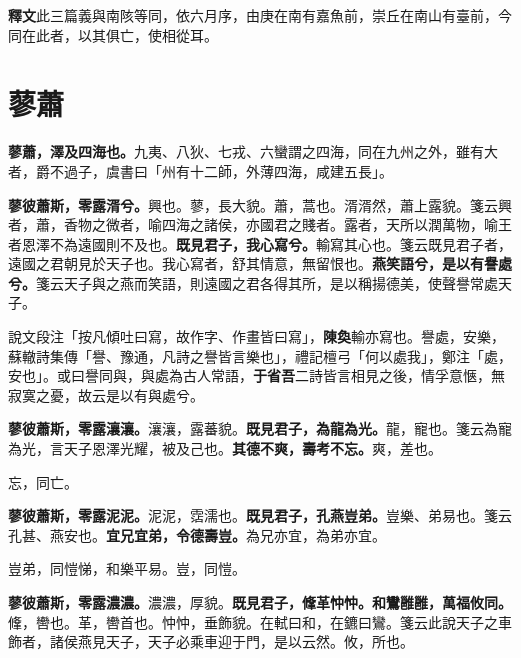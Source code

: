 \begin{quoting}\textbf{釋文}此三篇義與南陔等同，依六月序，由庚在南有嘉魚前，崇丘在南山有臺前，今同在此者，以其俱亡，使相從耳。\end{quoting}

\section{蓼蕭}


\textbf{蓼蕭，澤及四海也。}{\footnotesize 九夷、八狄、七戎、六蠻謂之四海，同在九州之外，雖有大者，爵不過子，虞書曰「州有十二師，外薄四海，咸建五長」。}

\textbf{蓼彼蕭斯，零露湑兮。}{\footnotesize 興也。蓼，長大貌。蕭，蒿也。湑湑然，蕭上露貌。箋云興者，蕭，香物之微者，喻四海之諸侯，亦國君之賤者。露者，天所以潤萬物，喻王者恩澤不為遠國則不及也。}\textbf{既見君子，我心寫兮。}{\footnotesize 輸寫其心也。箋云既見君子者，遠國之君朝見於天子也。我心寫者，舒其情意，無留恨也。}\textbf{燕笑語兮，是以有譽處兮。}{\footnotesize 箋云天子與之燕而笑語，則遠國之君各得其所，是以稱揚德美，使聲譽常處天子。}

\begin{quoting}說文段注「按凡傾吐曰寫，故作字、作畫皆曰寫」，\textbf{陳奐}輸亦寫也。譽處，安樂，蘇轍詩集傳「譽、豫通，凡詩之譽皆言樂也」，禮記檀弓「何以處我」，鄭注「處，安也」。或曰譽同與，與處為古人常語，\textbf{于省吾}二詩皆言相見之後，情孚意愜，無寂寞之憂，故云是以有與處兮。\end{quoting}

\textbf{蓼彼蕭斯，零露瀼瀼。}{\footnotesize 瀼瀼，露蕃貌。}\textbf{既見君子，為龍為光。}{\footnotesize 龍，寵也。箋云為寵為光，言天子恩澤光耀，被及己也。}\textbf{其德不爽，壽考不忘。}{\footnotesize 爽，差也。}

\begin{quoting}忘，同亡。\end{quoting}

\textbf{蓼彼蕭斯，零露泥泥。}{\footnotesize 泥泥，霑濡也。}\textbf{既見君子，孔燕豈弟。}{\footnotesize 豈樂、弟易也。箋云孔甚、燕安也。}\textbf{宜兄宜弟，令德壽豈。}{\footnotesize 為兄亦宜，為弟亦宜。}

\begin{quoting}豈弟，同愷悌，和樂平易。豈，同愷。\end{quoting}

\textbf{蓼彼蕭斯，零露濃濃。}{\footnotesize 濃濃，厚貌。}\textbf{既見君子，鞗革忡忡。和鸞雝雝，萬福攸同。}{\footnotesize 鞗，轡也。革，轡首也。忡忡，垂飾貌。在軾曰和，在鑣曰鸞。箋云此說天子之車飾者，諸侯燕見天子，天子必乘車迎于門，是以云然。攸，所也。}

